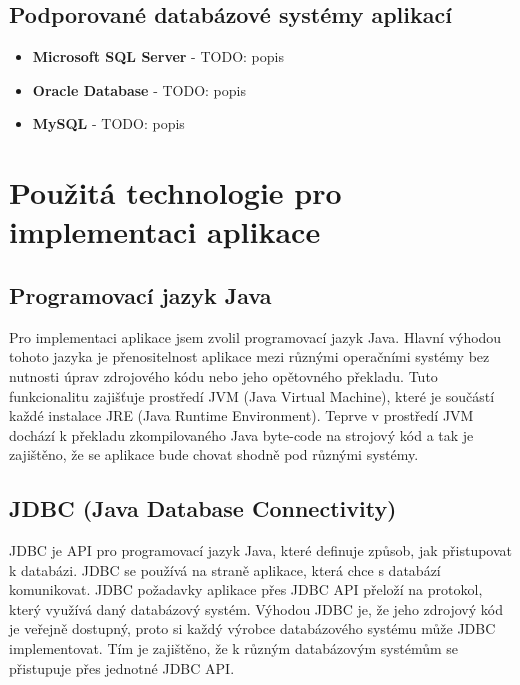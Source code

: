 \documentclass[czech,bachelor,public,dept460,male,cpdeclaration,twoside]{diploma}
\begin{document}
\subsection{Podporované databázové systémy aplikací}

\begin{itemize}
  \item \textbf{Microsoft SQL Server} - TODO: popis
  \item \textbf{Oracle Database} - TODO: popis
  \item \textbf{MySQL} - TODO: popis
\end{itemize}



\section{Použitá technologie pro implementaci aplikace} \label{tech}

\subsection{Programovací jazyk Java}
Pro implementaci aplikace jsem zvolil programovací jazyk Java. Hlavní výhodou tohoto jazyka je přenositelnost aplikace mezi různými operačními systémy bez nutnosti úprav zdrojového kódu nebo jeho opětovného překladu. Tuto funkcionalitu zajišťuje prostředí JVM (Java Virtual Machine), které je součástí každé instalace JRE (Java Runtime Environment). Teprve v prostředí JVM dochází k překladu zkompilovaného Java byte-code na strojový kód a tak je zajištěno, že se aplikace bude chovat shodně pod různými systémy.

\subsection{JDBC (Java Database Connectivity)} \label{jdbc}
JDBC je API pro programovací jazyk Java, které definuje způsob, jak přistupovat k databázi. JDBC se používá na straně aplikace, která chce s databází komunikovat. JDBC požadavky aplikace přes JDBC API přeloží na protokol, který využívá daný databázový systém. Výhodou JDBC je, že jeho zdrojový kód je veřejně dostupný, proto si každý výrobce databázového systému může JDBC implementovat. Tím je zajištěno, že k různým databázovým systémům se přistupuje přes jednotné JDBC API.
\end{document}

